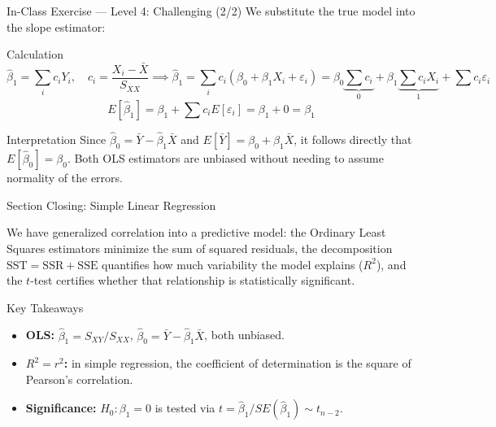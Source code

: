 \documentclass[10pt, aspectratio=169]{beamer}
\begin{document}
\begin{frame}{In-Class Exercise --- Level 4: Challenging (2/2)}
  \scriptsize
  We substitute the true model into the slope estimator: \pause

  \vspace{0.05cm}
  \begin{block}{Calculation}
    \scriptsize
    $$\hat\beta_1=\sum_i c_i Y_i, \quad c_i=\frac{X_i-\bar X}{S_{XX}} \implies \hat\beta_1=\sum_i c_i(\beta_0+\beta_1X_i+\varepsilon_i)=\beta_0\underbrace{\sum c_i}_{0}+\beta_1\underbrace{\sum c_iX_i}_{1}+\sum c_i\varepsilon_i$$
    $$E[\hat\beta_1]=\beta_1+\sum c_i E[\varepsilon_i]=\beta_1+0=\beta_1$$
  \end{block}

  \vspace{0.05cm}
  \pause
  \begin{alertblock}{Interpretation}
    \scriptsize
    Since $\hat\beta_0=\bar Y-\hat\beta_1\bar X$ and $E[\bar Y]=\beta_0+\beta_1\bar X$, it follows directly that $E[\hat\beta_0]=\beta_0$. Both OLS estimators are unbiased without needing to assume normality of the errors.
  \end{alertblock}
\end{frame}

\begin{frame}{Section Closing: Simple Linear Regression}
  \begin{reflexion}
    We have generalized correlation into a predictive model: the Ordinary Least Squares estimators minimize the sum of squared residuals, the decomposition $\text{SST}=\text{SSR}+\text{SSE}$ quantifies how much variability the model explains ($R^2$), and the $t$-test certifies whether that relationship is statistically significant.
  \end{reflexion}

  \vspace{0.2cm}
  \pause
  \begin{block}{Key Takeaways}
    \begin{itemize}\itemsep=0.08cm
      \item \textbf{OLS:} $\hat\beta_1=S_{XY}/S_{XX}$, $\hat\beta_0=\bar Y-\hat\beta_1\bar X$, both unbiased.
      \item \textbf{$R^2=r^2$:} in simple regression, the coefficient of determination is the square of Pearson's correlation.
      \item \textbf{Significance:} $H_0:\beta_1=0$ is tested via $t=\hat\beta_1/SE(\hat\beta_1)\sim t_{n-2}$.
    \end{itemize}
  \end{block}
\end{frame}
\end{document}
